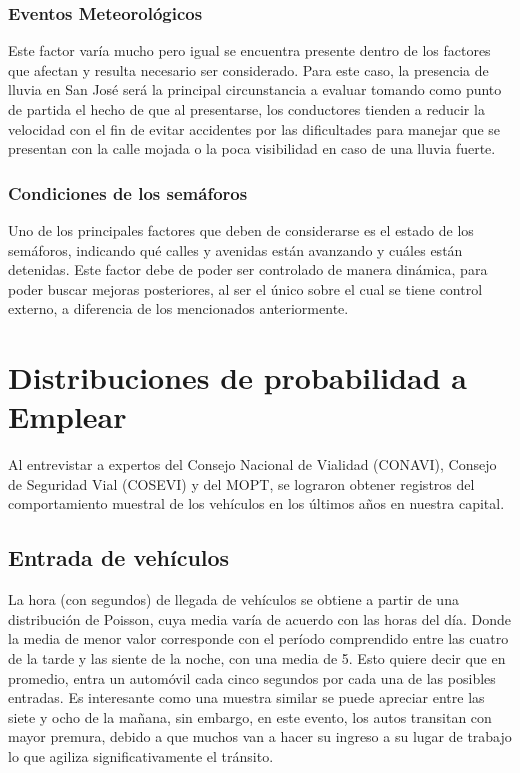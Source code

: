 \documentclass[12pt,journal,compsoc]{IEEEtran}
\begin{document}
\subsubsection{Eventos Meteorol\'{o}gicos}
Este factor var\'{i}a mucho pero igual se encuentra presente dentro de los factores que afectan y resulta necesario ser considerado. Para este caso, la presencia de lluvia en San Jos\'{e} ser\'{a} la principal circunstancia a evaluar tomando como punto de partida el hecho de que al presentarse, los conductores tienden a reducir la velocidad con el fin de evitar accidentes por las dificultades para manejar que se presentan con la calle mojada o la poca visibilidad en caso de una lluvia fuerte.

\subsubsection{Condiciones de los sem\'aforos}
Uno de los principales factores que deben de considerarse es el estado de los semáforos, indicando qu\'e calles y avenidas est\'an avanzando y cu\'ales est\'an detenidas. Este factor debe de poder ser controlado de manera din\'amica, para poder buscar mejoras posteriores, al ser el \'unico sobre el cual se tiene control externo, a diferencia de los mencionados anteriormente.


\section{Distribuciones de probabilidad a Emplear}
Al entrevistar a expertos del Consejo Nacional de Vialidad (CONAVI), Consejo de Seguridad Vial (COSEVI) y del MOPT, se lograron obtener registros del comportamiento muestral de los veh\'iculos en los \'ultimos a\~nos en nuestra capital. 

\subsection{Entrada de veh\'iculos}
La hora (con segundos) de llegada de veh\'iculos se obtiene a partir de una distribuci\'on de Poisson, cuya media var\'ia de acuerdo con las horas del d\'ia. Donde la media de menor valor corresponde con el per\'iodo comprendido entre las cuatro de la tarde y las siente de la noche, con una media de 5. Esto quiere decir que en promedio, entra un autom\'ovil cada cinco segundos por cada una de las posibles entradas. Es interesante como una muestra similar se puede apreciar entre las siete y ocho de la ma\~nana, sin embargo, en este evento, los autos transitan con mayor premura, debido a que muchos van a hacer su ingreso a su lugar de trabajo lo que agiliza significativamente el tr\'ansito.
\end{document}
